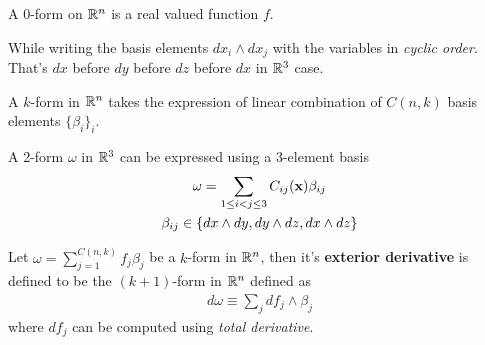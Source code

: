 \documentclass[11pt]{article}
\begin{document}
			\begin{definition}
				A 0-form on $\mathbb{R}^n$ is a real valued function $f$.
			\end{definition}
			
			\begin{remark}
				While writing the basis elements $dx_i \land dx_j$ with the variables in \emph{cyclic order}. That's $dx$ before $dy$ before $dz$ before $dx$ in $\mathbb{R}^3$ case.
			\end{remark}
			
			\begin{definition}
				A $k$-form in $\mathbb{R}^n$ takes the expression of linear combination of $C(n, k)$ basis elements $\{\beta_i\}_i$.
			\end{definition}
			
			\begin{example}
				A 2-form $\omega$ in $\mathbb{R}^3$ can be expressed using a 3-element basis 
				\begin{gather}
					\omega = \sum_{1 \leq i < j \leq 3} C_{ij}(\textbf{x}) \beta_{ij} \\
					\beta_{ij} \in \{dx \land dy, dy \land dz, dx \land dz\}
				\end{gather}
			\end{example}
			
			\begin{definition}
				Let $\omega = \sum_{j=1}^{C(n,k)} f_j \beta_j$ be a $k$-form in $\mathbb{R}^n$, then it's \textbf{exterior derivative} is defined to be the $(k+1)$-form in $\mathbb{R}^n$ defined as 
				\begin{gather}
					d\omega \equiv \sum_{j} df_j \land \beta_j
				\end{gather}
				where $df_j$ can be computed using \emph{total derivative}.
			\end{definition}
			
\end{document}
